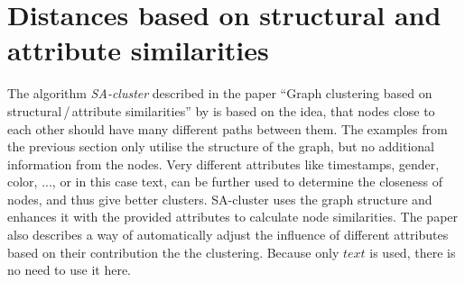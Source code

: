 \section{Distances based on structural and attribute similarities}
The algorithm \emph{SA-cluster} described in the paper \enquote{Graph clustering based on structural\,/\,attribute similarities} by \textcite{Zhou2009} is based on the idea, that nodes close to each other should have many different paths between them. The examples from the previous section only utilise the structure of the graph, but no additional information from the nodes. Very different attributes like timestamps, gender, color, ..., or in this case text, can be further used to determine the closeness of nodes, and thus give better clusters. SA-cluster uses the graph structure and enhances it with the provided attributes to calculate node similarities. The paper also describes a way of automatically adjust the influence of different attributes based on their contribution the the clustering. Because only $text$ is used, there is no need to use it here.



